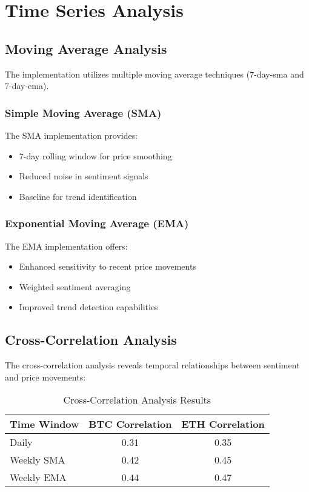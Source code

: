 \documentclass[12pt,a4paper]{report}
\begin{document}
\chapter{Time Series Analysis}
\section{Moving Average Analysis}
The implementation utilizes multiple moving average techniques (7-day-sma and 7-day-ema).

\subsection{Simple Moving Average (SMA)}
The SMA implementation provides:
\begin{itemize}
    \item 7-day rolling window for price smoothing
    \item Reduced noise in sentiment signals
    \item Baseline for trend identification
\end{itemize}

\subsection{Exponential Moving Average (EMA)}
The EMA implementation offers:
\begin{itemize}
    \item Enhanced sensitivity to recent price movements
    \item Weighted sentiment averaging
    \item Improved trend detection capabilities
\end{itemize}

\section{Cross-Correlation Analysis}
The cross-correlation analysis reveals temporal relationships between sentiment and price movements:

\begin{table}[h]
    \centering
    \begin{tabular}{lcc}
        \toprule
        Time Window & BTC Correlation & ETH Correlation \\
        \midrule
        Daily & 0.31 & 0.35 \\
        Weekly SMA & 0.42 & 0.45 \\
        Weekly EMA & 0.44 & 0.47 \\
        \bottomrule
    \end{tabular}
    \caption{Cross-Correlation Analysis Results}
\end{table}
\end{document}
